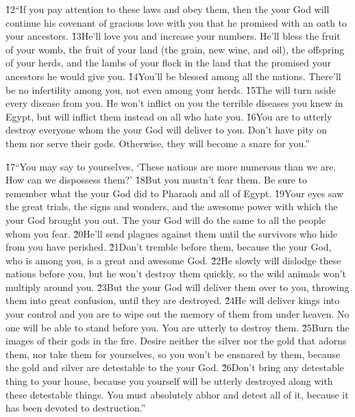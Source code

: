 \v{12}``If you pay attention to these laws and obey them, then the  your God will continue his covenant of gracious love with you that he promised with an oath to your ancestors. \v{13}He'll love you and increase your numbers. He'll bless the fruit of your womb, the fruit of your land (the grain, new wine, and oil), the offspring of your herds, and the lambs of your flock in the land that the  promised your ancestors he would give you. \v{14}You'll be blessed among all the nations. There'll be no infertility among you, not even among your herds. \v{15}The  will turn aside every disease from you. He won't inflict on you the terrible diseases you knew in Egypt, but will inflict them instead on all who hate you. \v{16}You are to utterly destroy everyone whom the  your God will deliver to you. Don't have pity on them nor serve their gods. Otherwise, they will become a snare for you.''

\v{17}``You may say to yourselves, `These nations are more numerous than we are. How can we dispossess them?' \v{18}But you mustn't fear them. Be sure to remember what the  your God did to Pharaoh and all of Egypt. \v{19}Your eyes saw the great trials, the signs and wonders, and the awesome power with which the  your God brought you out. The  your God will do the same to all the people whom you fear. \v{20}He'll send plagues against them until the survivors who hide from you have perished. \v{21}Don't tremble before them, because the  your God, who is among you, is a great and awesome God. \v{22}He slowly will dislodge these nations before you, but he won't destroy them quickly, so the wild animals won't multiply around you. \v{23}But the  your God will deliver them over to you, throwing them into great confusion, until they are destroyed. \v{24}He will deliver kings into your control and you are to wipe out the memory of them from under heaven. No one will be able to stand before you. You are utterly to destroy them. \v{25}Burn the images of their gods in the fire. Desire neither the silver nor the gold that adorns them, nor take them for yourselves, so you won't be ensnared by them, because the gold and silver are detestable to the  your God. \v{26}Don't bring any detestable thing to your house, because you yourself will be utterly destroyed along with these detestable things. You must absolutely abhor and detest all of it, because it has been devoted to destruction.''

